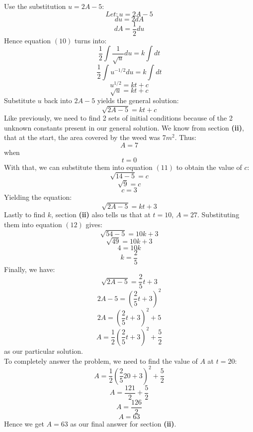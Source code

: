 \documentclass[hidelinks, a4paper, 12pt]{article}
\begin{document}
            Use the substitution $u = 2A-5$:
            \[Let: u = 2A - 5\]
            \[du = 2dA\]
            \[dA = \frac{1}{2}du\]
            Hence equation $(10)$ turns into:
            \[\frac{1}{2}\int \frac{1}{\sqrt{u}}du = k\int dt\]
            \[\frac{1}{2}\int u^{-1/2}du = k\int dt\]
            \[u^{1/2} = kt + c\]
            \[\sqrt{u} = kt + c\]
            Substitute $u$ back into $2A-5$ yields the general solution:
            \begin{equation}
                \sqrt{2A-5} = kt + c
            \end{equation}
            Like previously, we need to find 2 sets of initial conditions because of the 2 unknown constants present in our general solution.
            We know from section \textbf{(ii)}, that at the start, the area covered by the weed was 7$m^2$. Thus:
            \[A = 7\] when \[t = 0\]
            With that, we can substitute them into equation $(11)$ to obtain the value of $c$:
            \[\sqrt{14-5} = c\]
            \[\sqrt{9} = c\]
            \[c = 3\]
            Yielding the equation:
            \begin{equation}
                \sqrt{2A-5} = kt + 3
            \end{equation}
            Lastly to find $k$, section \textbf{(ii)} also tells us that at $t = 10$, $A = 27$. Substituting them into equation $(12)$ gives:
            \[\sqrt{54-5} = 10k + 3\]
            \[\sqrt{49} = 10k + 3\]
            \[4 = 10k\]
            \[k = \frac{2}{5}\]
            Finally, we have:
            \[\sqrt{2A-5} = \frac{2}{5}t + 3\]
            \[2A-5 = {\left(\frac{2}{5}t + 3\right)}^2\]
            \[2A = {\left(\frac{2}{5}t + 3\right)}^2 + 5\]
            \[A = \frac{1}{2}{\left(\frac{2}{5}t + 3\right)}^2 + \frac{5}{2}\]
            as our particular solution.\\[\baselineskip]
            To completely answer the problem, we need to find the value of $A$ at $t = 20$:
            \[A = \frac{1}{2}{\left(\frac{2}{5}20 + 3\right)}^2 + \frac{5}{2}\]
            \[A = \frac{121}{2}+ \frac{5}{2}\]
            \[A = \frac{126}{2}\]
            \[A = 63\]
            Hence we get $A = 63$ as our final answer for section \textbf{(ii)}.
\end{document}
